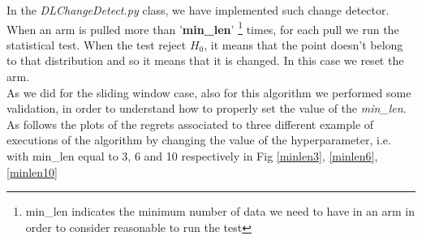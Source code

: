 In the \textit{DLChangeDetect.py} class, we have implemented such change detector. When an arm is pulled more than '\textbf{min\_len}' \footnote{min\_len indicates the minimum number of data we need to have in an arm in order to consider reasonable to run the test} times, for each pull we run the statistical test. When the test reject $H_0$, it means that the point doesn't belong to that distribution and so it means that it is changed. In this case we reset the arm.\\ 
As we did for the sliding window case, also for this algorithm we performed some validation, in order to understand how to properly set the value of the \textit{min\_len}. As follows the plots of the regrets associated to three different example of executions of the algorithm by changing the value of the hyperparameter, i.e. with min\_len equal to 3, 6 and 10 respectively in Fig \ref{minlen3}, \ref{minlen6}, \ref{minlen10}


